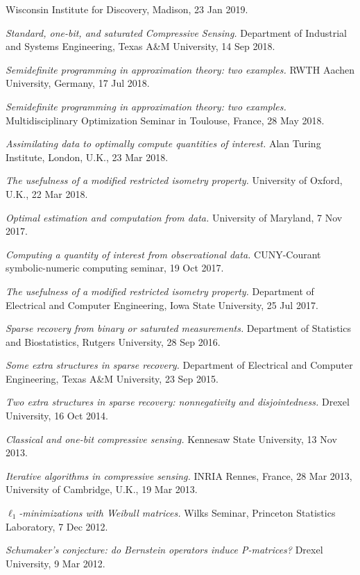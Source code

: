 \documentclass[11pt]{article}
\begin{document}
Wisconsin Institute for Discovery, Madison, 23 Jan 2019.
\item {\sl Standard, one-bit, and saturated Compressive Sensing.}
Department of Industrial and Systems Engineering, Texas A\&M University, 14 Sep 2018.
\item {\sl Semidefinite programming in approximation theory: two examples.}
RWTH Aachen University, Germany, 17 Jul 2018.
\item {\sl Semidefinite programming in approximation theory: two examples.} Multidisciplinary Optimization Seminar in Toulouse, France, 28 May 2018.
\item {\sl Assimilating data to optimally compute quantities of interest.} Alan Turing Institute, London, U.K., 23 Mar 2018.
\item {\sl The usefulness of a modified restricted isometry property.} University of Oxford, U.K., 22 Mar 2018.
\item {\sl Optimal estimation and computation from data.} University of Maryland, 7 Nov 2017.
\item {\sl Computing a quantity of interest from observational data.} CUNY-Courant symbolic-numeric computing seminar, 19 Oct 2017.
\item {\sl The usefulness of a modified restricted isometry property.} Department of Electrical and Computer Engineering, Iowa State University, 25 Jul 2017.
\item {\sl Sparse recovery from binary or saturated measurements.} Department of Statistics and Biostatistics, Rutgers University, 28 Sep 2016.
\item {\sl Some extra structures in sparse recovery.} Department of Electrical and Computer Engineering, Texas A\&M University, 23 Sep 2015.
\item {\sl Two extra structures in sparse recovery: nonnegativity and disjointedness.} Drexel University, 16 Oct 2014.
\item {\sl Classical and one-bit compressive sensing.} 
Kennesaw State University, 13 Nov 2013.
\item {\sl Iterative algorithms in compressive sensing.} INRIA Rennes, France, 28 Mar 2013,
University of Cambridge, U.K., 19 Mar 2013. 
\item {\sl $\ell_1$-minimizations with Weibull matrices.} Wilks Seminar, Princeton Statistics Laboratory, 7 Dec 2012.
\item {\sl Schumaker's conjecture: do Bernstein operators induce P-matrices?} Drexel University, 9 Mar 2012.
\end{document}
